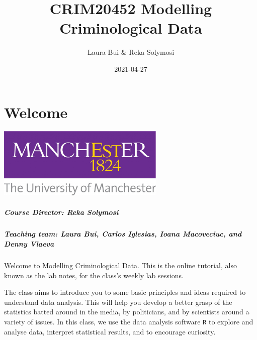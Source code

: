 \documentclass[
]{book}
\title{CRIM20452 Modelling Criminological Data}
\author{Laura Bui \& Reka Solymosi}
\date{2021-04-27}
\begin{document}
\maketitle

{
\setcounter{tocdepth}{1}
\tableofcontents
}
\hypertarget{welcome}{%
\chapter*{Welcome}\label{welcome}}

\includegraphics[width=0.6\textwidth,height=\textheight]{Images/UOM.jpg}

\hypertarget{course-director-reka-solymosi}{%
\paragraph*{Course Director: Reka Solymosi}\label{course-director-reka-solymosi}}

\hypertarget{teaching-team-laura-bui-carlos-iglesias-ioana-macoveciuc-and-denny-vlaeva}{%
\paragraph*{Teaching team: Laura Bui, Carlos Iglesias, Ioana Macoveciuc, and Denny Vlaeva}\label{teaching-team-laura-bui-carlos-iglesias-ioana-macoveciuc-and-denny-vlaeva}}

Welcome to Modelling Criminological Data. This is the online tutorial, also known as the lab notes, for the class's weekly lab sessions.

The class aims to introduce you to some basic principles and ideas required to understand data analysis. This will help you develop a better grasp of the statistics batted around in the media, by politicians, and by scientists around a variety of issues. In this class, we use the data analysis software \texttt{R} to explore and analyse data, interpret statistical results, and to encourage curiosity.
\end{document}
